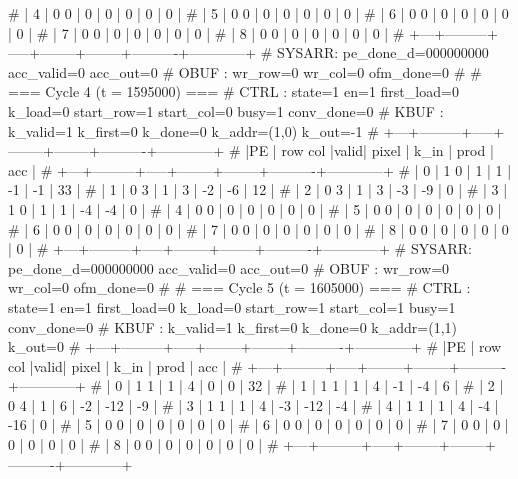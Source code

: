# | 4 |   0   0 |  0  |      0 |      0 |        0 |          0 |
# | 5 |   0   0 |  0  |      0 |      0 |        0 |          0 |
# | 6 |   0   0 |  0  |      0 |      0 |        0 |          0 |
# | 7 |   0   0 |  0  |      0 |      0 |        0 |          0 |
# | 8 |   0   0 |  0  |      0 |      0 |        0 |          0 |
# +---+---------+-----+--------+--------+----------+------------+
# SYSARR: pe_done_d=000000000 acc_valid=0 acc_out=0
# OBUF : wr_row=0 wr_col=0 ofm_done=0
# 
# === Cycle 4  (t = 1595000) ===
# CTRL : state=1 en=1 first_load=0 k_load=0 start_row=1 start_col=0 busy=1 conv_done=0
# KBUF : k_valid=1 k_first=0 k_done=0 k_addr=(1,0) k_out=-1
# +---+---------+-----+--------+--------+----------+------------+
# |PE | row col |valid| pixel  |  k_in  |   prod   |    acc     |
# +---+---------+-----+--------+--------+----------+------------+
# | 0 |   1   0 |  1  |      1 |     -1 |       -1 |         33 |
# | 1 |   0   3 |  1  |      3 |     -2 |       -6 |         12 |
# | 2 |   0   3 |  1  |      3 |     -3 |       -9 |          0 |
# | 3 |   1   0 |  1  |      1 |     -4 |       -4 |          0 |
# | 4 |   0   0 |  0  |      0 |      0 |        0 |          0 |
# | 5 |   0   0 |  0  |      0 |      0 |        0 |          0 |
# | 6 |   0   0 |  0  |      0 |      0 |        0 |          0 |
# | 7 |   0   0 |  0  |      0 |      0 |        0 |          0 |
# | 8 |   0   0 |  0  |      0 |      0 |        0 |          0 |
# +---+---------+-----+--------+--------+----------+------------+
# SYSARR: pe_done_d=000000000 acc_valid=0 acc_out=0
# OBUF : wr_row=0 wr_col=0 ofm_done=0
# 
# === Cycle 5  (t = 1605000) ===
# CTRL : state=1 en=1 first_load=0 k_load=0 start_row=1 start_col=1 busy=1 conv_done=0
# KBUF : k_valid=1 k_first=0 k_done=0 k_addr=(1,1) k_out=0
# +---+---------+-----+--------+--------+----------+------------+
# |PE | row col |valid| pixel  |  k_in  |   prod   |    acc     |
# +---+---------+-----+--------+--------+----------+------------+
# | 0 |   1   1 |  1  |      4 |      0 |        0 |         32 |
# | 1 |   1   1 |  1  |      4 |     -1 |       -4 |          6 |
# | 2 |   0   4 |  1  |      6 |     -2 |      -12 |         -9 |
# | 3 |   1   1 |  1  |      4 |     -3 |      -12 |         -4 |
# | 4 |   1   1 |  1  |      4 |     -4 |      -16 |          0 |
# | 5 |   0   0 |  0  |      0 |      0 |        0 |          0 |
# | 6 |   0   0 |  0  |      0 |      0 |        0 |          0 |
# | 7 |   0   0 |  0  |      0 |      0 |        0 |          0 |
# | 8 |   0   0 |  0  |      0 |      0 |        0 |          0 |
# +---+---------+-----+--------+--------+----------+------------+
